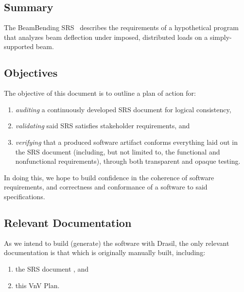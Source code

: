 \documentclass[12pt, titlepage]{article}
\begin{document}
\subsection{Summary}

The BeamBending SRS~\cite{BalaciBeamBendingSRS2023} describes the requirements
of a hypothetical program that analyzes beam deflection under imposed,
distributed loads on a simply-supported beam.

\subsection{Objectives}

The objective of this document is to outline a plan of action for:

\begin{enumerate}

    \item \textit{auditing} a continuously developed SRS document
          \cite{ParnasAndClements1986} for logical consistency,

    \item \textit{validating} said SRS satisfies stakeholder requirements, and

    \item \textit{verifying} that a produced software artifact conforms
          everything laid out in the SRS document (including, but not limited
          to, the functional and nonfunctional requirements), through both
          transparent and opaque testing.

\end{enumerate}

In doing this, we hope to build confidence in the coherence of software
requirements, and correctness and conformance of a software to said
specifications.

\subsection{Relevant Documentation}

As we intend to build (generate) the software with Drasil, the only relevant
documentation is that which is originally manually built, including:

\begin{enumerate}

    \item the SRS document \cite{BalaciBeamBendingSRS2023}, and

    \item this VnV Plan.

\end{enumerate}
\end{document}
